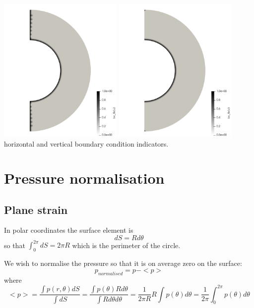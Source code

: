 \begin{center}
\includegraphics[width=6cm]{python_codes/fieldstone_152/images/bcfix_u}
\includegraphics[width=6cm]{python_codes/fieldstone_152/images/bcfix_v}\\
{\captionfont horizontal and vertical boundary condition indicators.}
\end{center}

\section*{Pressure normalisation}

\subsection*{Plane strain}

In polar coordinates the surface element is 
\[
dS = R d\theta
\]
so that 
$\int_0^{2\pi} dS = 2 \pi R$ which is the perimeter of the circle.

We wish to normalise the pressure so that it is on average zero on the surface:
\[
p_{normalised} = p - <p>
\]
where 
\[
<p> 
= \frac{\int p(r, \theta) dS }{\int dS}
= \frac{\int p(\theta) R d\theta }{\int R d \theta d\theta}
= \frac{1}{2 \pi R} R \int p(\theta) d\theta 
= \frac{1}{2 \pi }  \int_0^{2\pi} p(\theta) d\theta 
\]


